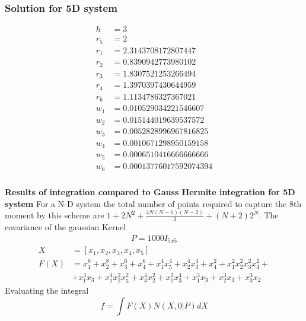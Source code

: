 \documentclass[11pt]{beamer}
\begin{document}
\begin{frame}
\frametitle{Solution for 5D system}
\small
\begin{align}
h&=3 \nonumber \\
r_5&=2\nonumber\\
r_1&=2.3143708172807447\nonumber\\
r_2&=0.8390942773980102\nonumber\\
r_3&=1.8307521253266494\nonumber\\
r_4&=1.3970397430644959\nonumber\\
r_6&=1.1134786327367021\nonumber\\
w_1 &= 0.010529034221546607\nonumber\\
w_2 &= 0.015144019639537572\nonumber\\
w_3 &= 0.0052828996967816825\nonumber\\
w_4&=0.0010671298950159158\nonumber\\
w_5&=0.0006510416666666666\nonumber\\
w_6 &= 0.00013776017592074394 
\end{align}
\end{frame}
\begin{frame}
\frametitle{}
{\bf Results of integration compared to Gauss Hermite integration for 5D system}\newline
For a N-D system the total number of points required to capture the 8th moment  by this scheme are \newline $1+2N^2+\frac{4N(N-1)(N-2)}{3}+(N+2)2^N$.\newline
 The covariance of the gaussian Kernel
\begin{align}
P=1000I_{5x5}
\end{align}
\begin{align}
X&=[x_1,x_2,x_3,x_4,x_5]\\
F(X)&=x_1^8+x_2^8+x_3^6+x_4^6+x_1^4x_5^4+x_2^4x_3^4+x_4^2+x_1^2x_2^2x_3^2x_4^2+\nonumber \\
&+x_1^3x_3+x_1^4x_2^2x_5^2+x_3^4x_2^2+x_1^2x_3^4+x_1^3x_3+x_2^3x_3+x_3^3x_2
\end{align}
Evaluating the integral
\begin{equation}
f=\int{F(X)N(X,0|P)}dX
\end{equation}
\end{frame}
\end{document}
